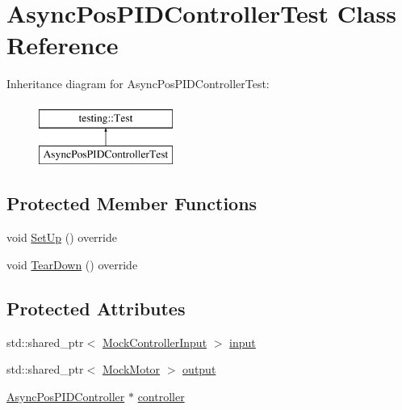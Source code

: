 \hypertarget{classAsyncPosPIDControllerTest}{}\section{Async\+Pos\+P\+I\+D\+Controller\+Test Class Reference}
\label{classAsyncPosPIDControllerTest}
Inheritance diagram for Async\+Pos\+P\+I\+D\+Controller\+Test\+:\begin{figure}[H]
\begin{center}
\leavevmode
\includegraphics[height=2.000000cm]{classAsyncPosPIDControllerTest}
\end{center}
\end{figure}
\subsection*{Protected Member Functions}
\begin{DoxyCompactItemize}
\item 
void \mbox{\hyperlink{classAsyncPosPIDControllerTest_ace99fff2e9eeccbdefa54d6103e968ae}{Set\+Up}} () override
\item 
void \mbox{\hyperlink{classAsyncPosPIDControllerTest_ad5937276fbd677ef831580a5d41b2d3e}{Tear\+Down}} () override
\end{DoxyCompactItemize}
\subsection*{Protected Attributes}
\begin{DoxyCompactItemize}
\item 
std\+::shared\+\_\+ptr$<$ \mbox{\hyperlink{classokapi_1_1MockControllerInput}{Mock\+Controller\+Input}} $>$ \mbox{\hyperlink{classAsyncPosPIDControllerTest_ade8dfb0e763f75f2013fa450a58bfac4}{input}}
\item 
std\+::shared\+\_\+ptr$<$ \mbox{\hyperlink{classokapi_1_1MockMotor}{Mock\+Motor}} $>$ \mbox{\hyperlink{classAsyncPosPIDControllerTest_a27e472ee9e99191880c195e6951d6d4b}{output}}
\item 
\mbox{\hyperlink{classokapi_1_1AsyncPosPIDController}{Async\+Pos\+P\+I\+D\+Controller}} $\ast$ \mbox{\hyperlink{classAsyncPosPIDControllerTest_afa02457d6de919f45f2a72ee11db3aee}{controller}}
\end{DoxyCompactItemize}
